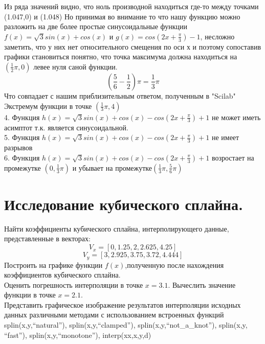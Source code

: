 \documentclass[russian,utf8,nocolumnxxxi,nocolumnxxxii]{eskdtext}
\begin{document}
Из ряда значений видно, что ноль производной находиться где-то между точками (1.047,0) и (1.048)
Но принимая во внимание то что нашу функцию можно разложить на две более простые синусоидальные функции $f(x)=\sqrt{3}sin(x)+cos(x)$ и $g(x)=cos(2x+\frac{\pi}{3})-1$, несложно заметить, что у них нет относительного смещения по оси х и поэтому сопоставив графики становиться понятно, что точка максимума должна находиться на $(\frac{1}{2}\pi,0)$
левее нуля саной функции.
$$ \left(\frac{5}{6}-\frac{1}{2} \right)\pi=\frac{1}{3}\pi$$
Что совпадает с нашим приблизительным ответом, полученным в "Scilab" \\
 Экстремум функции в точке $(\frac{1}{3}\pi,4)$ \\

 4. Функция $h(x)=\sqrt{3}sin(x)+cos(x)-cos(2x+\frac{\pi}{3})+1$ не может иметь асимптот т.к. является синусоидальной. \\
 
 5. Функция $h(x)=\sqrt{3}sin(x)+cos(x)-cos(2x+\frac{\pi}{3})+1$ не имеет разрывов \\
 
 6. Функция $h(x)=\sqrt{3}sin(x)+cos(x)-cos(2x+\frac{\pi}{3})+1$ возростает на промежутке $(0,\frac{1}{3}\pi)$ и убывает на промежутке$(\frac{1}{3}\pi,\frac{5}{6}\pi)$
 













\newpage


\section{Исследование кубического сплайна.}
 Найти коэффициенты кубического сплайна, интерполирующего данные, представленные в векторах:\\
$$V_{x}=[0,1.25,2,2.625,4.25]$$ 
$$V_{y}=[3,2.925,3.75,3.72,4.444]$$
Построить на графике функции $f(x)$,полученную после нахождения коэффициентов кубического сплайна. 
\\Оценить погрешность интерполяции в точке $x=3.1$. Вычеслить значение функции в точке $x=2.1$.
\\Представить графическое изображение результатов интерполяции исходных данных различными методами с использованием встроенных функций\\ splin(x,y,“natural”), splin(x,y,“clamped”), splin(x,y,“not\_a\_knot”), splin(x,y, “fast”), splin(x,y,“monotone”), interp(xx,x,y,d)
\end{document}
